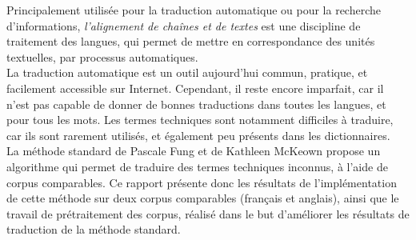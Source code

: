 
Principalement utilisée pour la traduction automatique ou pour la recherche d'informations, \textit{l'alignement de chaînes et de textes} est une discipline de traitement des langues, qui permet de mettre en correspondance des unités textuelles, par processus automatiques.\\

La traduction automatique est un outil aujourd'hui commun, pratique, et facilement accessible sur Internet. Cependant, il reste encore imparfait, car il n'est pas capable de donner de bonnes traductions dans toutes les langues, et pour tous les mots. Les termes techniques sont notamment difficiles à traduire, car ils sont rarement utilisés, et également peu présents dans les dictionnaires.\\

La méthode standard de Pascale Fung et de Kathleen McKeown\cite{Fung97findingterminology} propose un algorithme qui permet de traduire des termes techniques inconnus, à l'aide de corpus comparables. Ce rapport présente donc les résultats de l'implémentation de cette méthode sur deux corpus comparables (français et anglais), ainsi que le travail de prétraitement des corpus, réalisé dans le but d'améliorer les résultats de traduction de la méthode standard.

